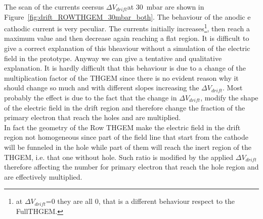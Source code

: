 \documentclass[a4paper, 11 pt]{report}
\newcommand{\Vdrift}{$ \Delta V_{drift}$}
\begin{document}
The scan of the currents ceersus \Vdrift at 30~mbar are shown in Figure~\ref{fig:drift_ROWTHGEM_30mbar_both}.
The behaviour of the anodic e cathodic current is very peculiar. The currents initially 
increases\footnote{at \Vdrift=0 they are all 0, that is a different behaviour respect to the 
FullTHGEM.}, then reach a maximum value and then decrease again reaching a flat region. It is 
difficult to give a correct explanation of this bheaviour without a simulation of the electric 
field in the prototype. Anyway we can give a tentative and qualitative explanation. 
It is hardly difficult that this behaviour is due to a change of the multiplication factor of the 
THGEM since there is no evident reason why it should change so much and with different slopes 
increasing the \Vdrift. Most probably the effect is due to the fact that the change in \Vdrift, 
modify the shape of the electric field in the drift region and therefore change the fraction of the 
primary electron that reach the holes and are multiplied.\\
In fact the geometry of the Row THGEM make the electric field in the drift region not homogeneous 
since part of the field line that start from the cathode will be funneled in the hole while part of 
them will reach the inert region of the THGEM, i.e. that one without hole. Such ratio is modified 
by the applied \Vdrift therefore affecting the number for primary electron that reach the hole 
region and are effectively multiplied.
\end{document}
